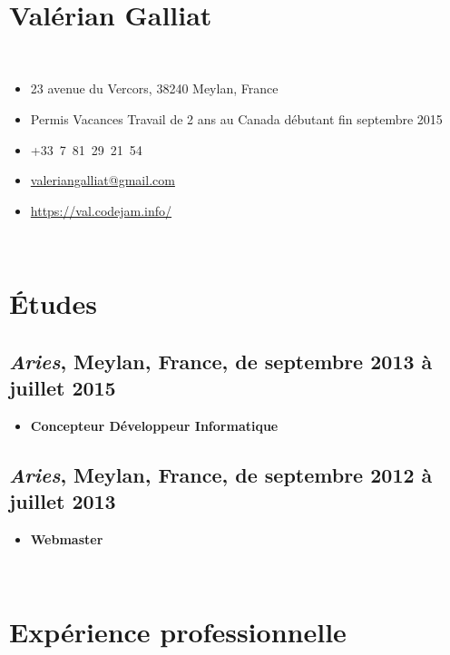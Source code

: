 \documentclass[a4paper]{article}
\begin{document}
~

\section*{\huge Valérian Galliat}

~

\begin{itemize}
  \item 23 avenue du Vercors, 38240 Meylan, France
  \item Permis Vacances Travail de 2 ans au Canada débutant fin septembre 2015
  \item +33~7~81~29~21~54
  \item \href{mailto:valeriangalliat@gmail.com}{valeriangalliat@gmail.com}
  \item \url{https://val.codejam.info/}
\end{itemize}

~

\section*{Études}

\subsection*{
  \textit{Aries},
  Meylan, France,
  de septembre 2013 à juillet 2015
}

\begin{itemize}
  \item
    \textbf{Concepteur Développeur Informatique}
\end{itemize}

\subsection*{
  \textit{Aries},
  Meylan, France,
  de septembre 2012 à juillet 2013
}

\begin{itemize}
  \item
    \textbf{Webmaster}
\end{itemize}

~

\section*{Expérience professionnelle}
\end{document}
